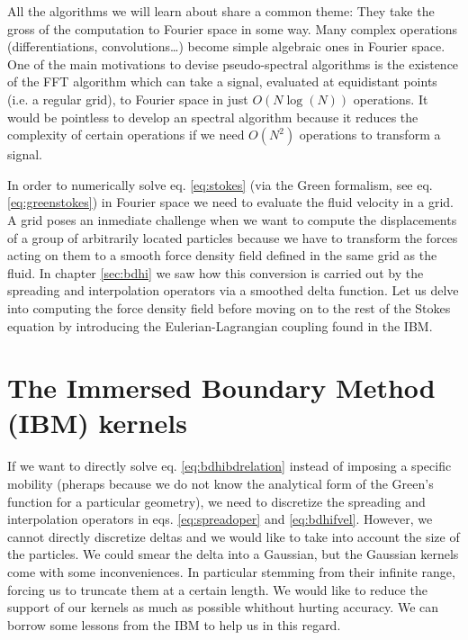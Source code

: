 \documentclass[ twoside,openright,titlepage,numbers=noenddot,%
headinclude,footinclude,cleardoublepage=empty,abstract=on,
BCOR=5mm,paper=a4,fontsize=11pt, dvipsnames
]{scrreprt}
\begin{document}
All the algorithms we will learn about share a common theme: They take the gross of the computation to Fourier space in some way. Many complex operations (differentiations, convolutions\dots) become simple algebraic ones in Fourier space. One of the main motivations to devise pseudo-spectral algorithms is the existence of the \gls{FFT} algorithm which can take a signal, evaluated at equidistant points (i.e. a regular grid), to Fourier space in just $O(N\log(N))$ operations. It would be pointless to develop an spectral algorithm because it reduces the complexity of certain operations if we need $O(N^2)$ operations to transform a signal.

In order to numerically solve eq. \eqref{eq:stokes} (via the Green formalism, see eq. \eqref{eq:greenstokes}) in Fourier space we need to evaluate the fluid velocity in a grid.
A grid poses an inmediate challenge when we want to compute the displacements of a group of arbitrarily located particles because we have to transform the forces acting on them to a smooth force density field defined in the same grid as the fluid. In chapter \ref{sec:bdhi} we saw how this conversion is carried out by the spreading and interpolation operators via a smoothed delta function. Let us delve into computing the force density field before moving on to the rest of the Stokes equation by introducing the Eulerian-Lagrangian coupling found in the \gls{IBM}.

\section{The Immersed Boundary Method (IBM) kernels}\label{sec:ibm}
If we want to directly solve eq. \eqref{eq:bdhibdrelation} instead of imposing a specific mobility (pheraps because we do not know the analytical form of the Green's function for a particular geometry), we need to discretize the spreading and interpolation operators in eqs. \eqref{eq:spreadoper} and \eqref{eq:bdhifvel}. However, we cannot directly discretize deltas and we would like to take into account the size of the particles. We could smear the delta into a Gaussian, but the Gaussian kernels come with some inconveniences. In particular stemming from their infinite range, forcing us to truncate them at a certain length. We would like to reduce the support of our kernels as much as possible whithout hurting accuracy. We can borrow some lessons from the \gls{IBM} to help us in this regard.
\end{document}
